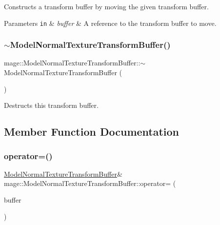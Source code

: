Constructs a transform buffer by moving the given transform buffer.


\begin{DoxyParams}[1]{Parameters}
\mbox{\tt in}  & {\em buffer} & A reference to the transform buffer to move. \\
\hline
\end{DoxyParams}
\hypertarget{structmage_1_1_model_normal_texture_transform_buffer_a5b37f45ead4f5b40e2d9de8ef116a057}{}\label{structmage_1_1_model_normal_texture_transform_buffer_a5b37f45ead4f5b40e2d9de8ef116a057} 
\subsubsection{\texorpdfstring{$\sim$\+Model\+Normal\+Texture\+Transform\+Buffer()}{~ModelNormalTextureTransformBuffer()}}
{\footnotesize\ttfamily mage\+::\+Model\+Normal\+Texture\+Transform\+Buffer\+::$\sim$\+Model\+Normal\+Texture\+Transform\+Buffer (\begin{DoxyParamCaption}{ }\end{DoxyParamCaption})\hspace{0.3cm}{\ttfamily [default]}}

Destructs this transform buffer. 

\subsection{Member Function Documentation}
\hypertarget{structmage_1_1_model_normal_texture_transform_buffer_a5ce1f572ceecdb53b66d6f3f8f03e5f8}{}\label{structmage_1_1_model_normal_texture_transform_buffer_a5ce1f572ceecdb53b66d6f3f8f03e5f8} 
\subsubsection{\texorpdfstring{operator=()}{operator=()}\hspace{0.1cm}{\footnotesize\ttfamily [1/2]}}
{\footnotesize\ttfamily \hyperlink{structmage_1_1_model_normal_texture_transform_buffer}{Model\+Normal\+Texture\+Transform\+Buffer}\& mage\+::\+Model\+Normal\+Texture\+Transform\+Buffer\+::operator= (\begin{DoxyParamCaption}\item[{const \hyperlink{structmage_1_1_model_normal_texture_transform_buffer}{Model\+Normal\+Texture\+Transform\+Buffer} \&}]{buffer }\end{DoxyParamCaption})\hspace{0.3cm}{\ttfamily [default]}}

